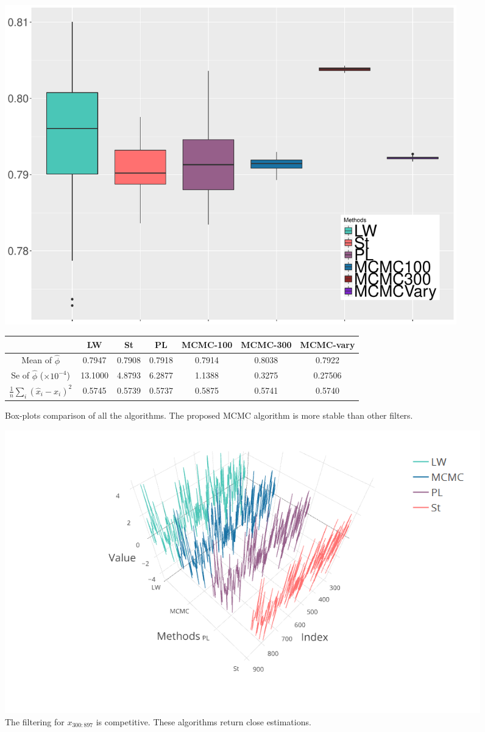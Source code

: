  
\begin{figure}[h]
\centering
\includegraphics[width=0.95\textwidth]{Chapters/04Filtering/plot/CompMCMCboxplotALL.pdf}
\begin{tabular}{|c|c|c|c|c|c|c|}
\hline
     & LW & St & PL  & MCMC-100 & MCMC-300 & MCMC-vary \\ \hline
Mean of $\hat{\phi}$ & 0.7947 &   0.7908   &  0.7918 & 0.7914 &  0.8038& 0.7922 \\ \hline
Se of $\hat{\phi}$ ($\times 10^{-4}$) &  13.1000  & 4.8793 & 6.2877 & 1.1388 & 0.3275 & 0.27506 \\ \hline
$\frac{1}{n}\sum_i(\hat{x}_i-x_i)^2$ & 0.5745 & 0.5739 & 0.5737 & 0.5875&  0.5741 &  0.5740 \\ \hline
\end{tabular}
\caption{Box-plots comparison of all the algorithms. The proposed MCMC algorithm is more stable than other filters.} \label{FilterRiewComparesionTable}
\end{figure}


\begin{figure}[h]
\centering
\includegraphics[width=\textwidth]{Chapters/04Filtering/plot/plotlyFilterCompX2.png}
\caption{The filtering for $x_{300:897}$ is competitive. These algorithms return close estimations. } \label{FilterRiewComparesion02}
\end{figure}


